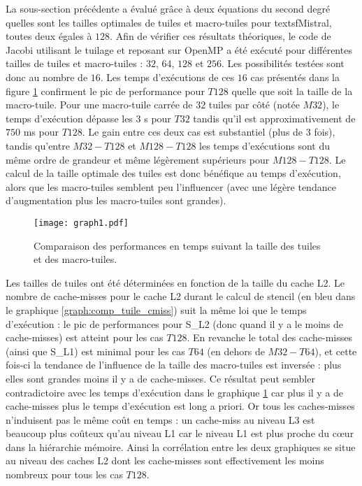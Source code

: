 La sous-section précédente a évalué grâce à deux équations du second degré quelles sont les tailles optimales de tuiles et macro-tuiles pour textsf{Mistral}, toutes deux égales à $128$. Afin de vérifier ces résultats théoriques, le code de Jacobi utilisant le tuilage et reposant sur \textsf{OpenMP} a été exécuté pour différentes tailles de tuiles et macro-tuiles : $32$, $64$, $128$ et $256$. Les possibilités testées sont donc au nombre de $16$. Les temps d'exécutions de ces $16$ cas présentés dans la figure \ref{graph:comp_tuile_time} confirment le pic de performance pour $T128$ quelle que soit la taille de la macro-tuile. Pour une macro-tuile carrée de $32$ tuiles par côté (notée $M32$), le temps d'exécution dépasse les $3$ s pour $T32$ tandis qu'il est approximativement de $750$ ms pour $T128$. Le gain entre ces deux cas est substantiel (plus de $3$ fois), tandis qu'entre $M32-T128$ et $M128-T128$ les temps d'exécutions sont du même ordre de grandeur et même légèrement supérieurs pour $M128-T128$. Le calcul de la taille optimale des tuiles est donc bénéfique au temps d'exécution, alors que les macro-tuiles semblent peu l'influencer (avec une légère tendance d'augmentation plus les macro-tuiles sont grandes).

\begin{figure}[!h]
  \caption{Comparaison des performances en temps suivant la taille des tuiles et des macro-tuiles.}
  \label{graph:comp_tuile_time}
  \texttt{[image: graph1.pdf]}
\end{figure}

Les tailles de tuiles ont été déterminées en fonction de la taille du cache L2. Le nombre de cache-misses pour le cache L2 durant le calcul de stencil (en bleu dans le graphique \ref{graph:comp_tuile_cmiss}) suit la même loi que le temps d'exécution : le pic de performances pour S\_L2 (donc quand il y a le moins de cache-misses) est atteint pour les cas $T128$. En revanche le total des cache-misses (ainsi que S\_L1) est minimal pour les cas $T64$ (en dehors de $M32-T64$), et cette fois-ci la tendance de l'influence de la taille des macro-tuiles est inversée : plus elles sont grandes moins il y a de cache-misses. Ce résultat peut sembler contradictoire avec les temps d'exécution dans le graphique \ref{graph:comp_tuile_time} car plus il y a de cache-misses plus le temps d'exécution est long a priori. Or tous les caches-misses n'induisent pas le même coût en temps : un cache-miss au niveau L3 est beaucoup plus coûteux qu'au niveau L1 car le niveau L1 est plus proche du cœur dans la hiérarchie mémoire. Ainsi la corrélation entre les deux graphiques se situe au niveau des caches L2 dont les cache-misses sont effectivement les moins nombreux pour tous les cas $T128$. 

